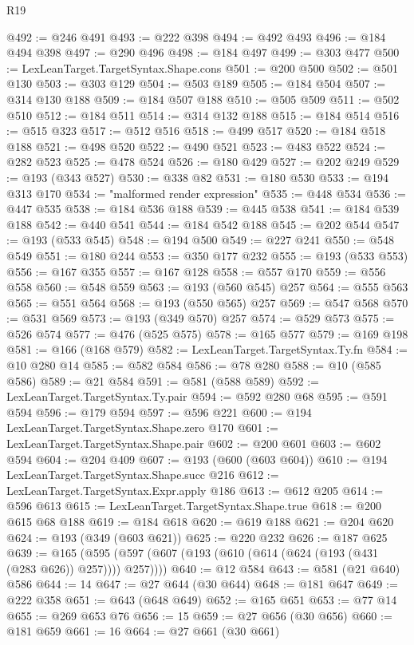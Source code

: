 \begin{lexlean}{R19}
\begin{coremodule}
@492 := @246 @491
@493 := @222 @398
@494 := @492 @493
@496 := @184 @494 @398
@497 := @290 @496
@498 := @184 @497
@499 := @303 @477
@500 := LexLeanTarget.TargetSyntax.Shape.cons
@501 := @200 @500
@502 := @501 @130
@503 := @303 @129
@504 := @503 @189
@505 := @184 @504
@507 := @314 @130 @188
@509 := @184 @507 @188
@510 := @505 @509
@511 := @502 @510
@512 := @184 @511
@514 := @314 @132 @188
@515 := @184 @514
@516 := @515 @323
@517 := @512 @516
@518 := @499 @517
@520 := @184 @518 @188
@521 := @498 @520
@522 := @490 @521
@523 := @483 @522
@524 := @282 @523
@525 := @478 @524
@526 := @180 @429
@527 := @202 @249
@529 := @193 (@343 @527)
@530 := @338 @82
@531 := @180 @530
@533 := @194 @313 @170
@534 := "malformed render expression"
@535 := @448 @534
@536 := @447 @535
@538 := @184 @536 @188
@539 := @445 @538
@541 := @184 @539 @188
@542 := @440 @541
@544 := @184 @542 @188
@545 := @202 @544
@547 := @193 (@533 @545)
@548 := @194 @500
@549 := @227 @241
@550 := @548 @549
@551 := @180 @244
@553 := @350 @177 @232
@555 := @193 (@533 @553)
@556 := @167 @355
@557 := @167 @128
@558 := @557 @170
@559 := @556 @558
@560 := @548 @559
@563 := @193 (@560 @545) @257
@564 := @555 @563
@565 := @551 @564
@568 := @193 (@550 @565) @257
@569 := @547 @568
@570 := @531 @569
@573 := @193 (@349 @570) @257
@574 := @529 @573
@575 := @526 @574
@577 := @476 (@525 @575)
@578 := @165 @577
@579 := @169 @198
@581 := @166 (@168 @579)
@582 := LexLeanTarget.TargetSyntax.Ty.fn
@584 := @10 @280 @14
@585 := @582 @584
@586 := @78 @280
@588 := @10 (@585 @586)
@589 := @21 @584
@591 := @581 (@588 @589)
@592 := LexLeanTarget.TargetSyntax.Ty.pair
@594 := @592 @280 @68
@595 := @591 @594
@596 := @179 @594
@597 := @596 @221
@600 := @194 LexLeanTarget.TargetSyntax.Shape.zero @170
@601 := LexLeanTarget.TargetSyntax.Shape.pair
@602 := @200 @601
@603 := @602 @594
@604 := @204 @409
@607 := @193 (@600 (@603 @604))
@610 := @194 LexLeanTarget.TargetSyntax.Shape.succ @216
@612 := LexLeanTarget.TargetSyntax.Expr.apply @186
@613 := @612 @205
@614 := @596 @613
@615 := LexLeanTarget.TargetSyntax.Shape.true
@618 := @200 @615 @68 @188
@619 := @184 @618
@620 := @619 @188
@621 := @204 @620
@624 := @193 (@349 (@603 @621))
@625 := @220 @232
@626 := @187 @625
@639 := @165 (@595 (@597 (@607 (@193 (@610 (@614 (@624 (@193 (@431 (@283 @626)) @257)))) @257))))
@640 := @12 @584
@643 := @581 (@21 @640) @586
@644 := 14
@647 := @27 @644 (@30 @644)
@648 := @181 @647
@649 := @222 @358
@651 := @643 (@648 @649)
@652 := @165 @651
@653 := @77 @14
@655 := @269 @653 @76
@656 := 15
@659 := @27 @656 (@30 @656)
@660 := @181 @659
@661 := 16
@664 := @27 @661 (@30 @661)

\end{coremodule}
\end{lexlean}
